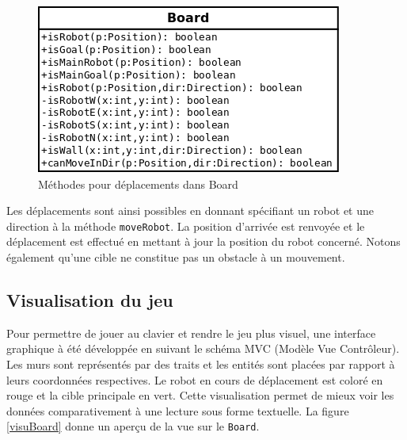 \documentclass[a4paper]{article} %
\begin{document}
\begin{figure}[htpb]
	\begin{center}
	\includegraphics[scale=0.5]{./images/boardMove.png}
	\caption{Méthodes pour déplacements dans Board}
	\end{center}
\end{figure}

Les déplacements sont ainsi possibles en donnant spécifiant un robot et une direction à la méthode \texttt{moveRobot}. La position d'arrivée est renvoyée et le déplacement est effectué en mettant à jour la position du robot concerné. Notons également qu'une cible ne constitue pas un obstacle à un mouvement.

	\subsection{Visualisation du jeu}
Pour permettre de jouer au clavier et rendre le jeu plus visuel, une interface graphique à été développée en suivant le schéma MVC (Modèle Vue Contrôleur). Les murs sont représentés par des traits et les entités sont placées par rapport à leurs coordonnées respectives. Le robot en cours de déplacement est coloré en rouge et la cible principale en vert. Cette visualisation permet de mieux voir les données comparativement à une lecture sous forme textuelle.
La figure \ref{visuBoard} donne un aperçu de la vue sur le \texttt{Board}.
\end{document}
